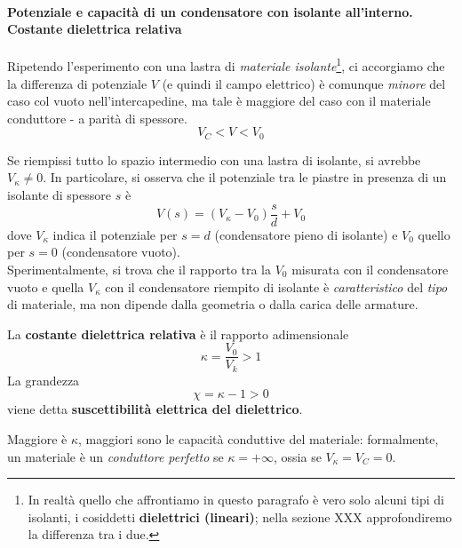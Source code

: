 \paragraph{Potenziale e capacità di un condensatore con isolante all'interno. Costante dielettrica relativa}
Ripetendo l'esperimento con una lastra di \textit{materiale isolante}\footnote{In realtà quello che affrontiamo in questo paragrafo è vero solo alcuni tipi di isolanti, i cosiddetti \textbf{dielettrici (lineari)}; nella sezione XXX approfondiremo la differenza tra i due.}, ci accorgiamo che la differenza di potenziale $V$ (e quindi il campo elettrico) è comunque \textit{minore} del caso col vuoto nell'intercapedine, ma tale \ddp è maggiore del caso con il materiale conduttore  - a parità di spessore.
\begin{equation*}
	V_{C}<V<V_0
\end{equation*} %

Se riempissi tutto lo spazio intermedio con una lastra di isolante, si avrebbe $V_{\kappa}\neq0$. In particolare, si osserva che il potenziale tra le piastre in presenza di un isolante di spessore $s$ è
\begin{equation*}
	V(s)=\left(V_{\kappa}-V_0\right)\frac{s}{d}+V_0
\end{equation*} 
dove $V_{\kappa}$ indica il potenziale per $s=d$ (condensatore pieno di isolante) e $V_0$ quello per $s=0$  (condensatore vuoto).\\
Sperimentalmente, si trova che il rapporto tra la \ddp $V_0$ misurata con il condensatore vuoto e quella $V_{\kappa}$ con il condensatore riempito di isolante è \textit{caratteristico} del \textit{tipo} di materiale, ma non dipende dalla geometria o dalla carica delle armature.
\begin{define}
	La \textbf{costante dielettrica relativa} è il rapporto adimensionale
	\begin{equation}
		\kappa=\frac{V_0}{V_k}>1
	\end{equation}
	La grandezza
	\begin{equation}
		\chi=\kappa - 1>0
	\end{equation}
	viene detta \textbf{suscettibilità elettrica del dielettrico}.
\end{define}
Maggiore è $\kappa$, maggiori sono le capacità conduttive del materiale: formalmente, un materiale è un \textit{conduttore perfetto} se $\kappa=+\infty$, ossia se $V_{\kappa}=V_C=0$.

